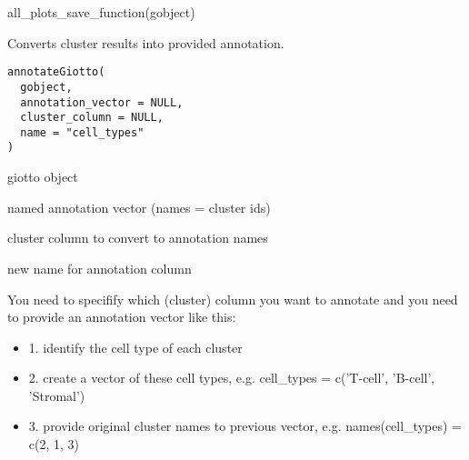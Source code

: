 \documentclass[a4paper]{book}
\begin{document}
%
\begin{SeeAlso}\relax
{}
\end{SeeAlso}
%
\begin{Examples}
\begin{ExampleCode}
    all_plots_save_function(gobject)
\end{ExampleCode}
\end{Examples}
%
\begin{Description}\relax
Converts cluster results into provided annotation.
\end{Description}
%
\begin{Usage}
\begin{verbatim}
annotateGiotto(
  gobject,
  annotation_vector = NULL,
  cluster_column = NULL,
  name = "cell_types"
)
\end{verbatim}
\end{Usage}
%
\begin{Arguments}
\begin{ldescription}
\item[\code{gobject}] giotto object

\item[\code{annotation\_vector}] named annotation vector (names = cluster ids)

\item[\code{cluster\_column}] cluster column to convert to annotation names

\item[\code{name}] new name for annotation column
\end{ldescription}
\end{Arguments}
%
\begin{Details}\relax
You need to specifify which (cluster) column you want to annotate
and you need to provide an annotation vector like this:
\begin{itemize}

\item{} 1. identify the cell type of each cluster
\item{} 2. create a vector of these cell types, e.g. cell\_types =  c('T-cell', 'B-cell', 'Stromal')
\item{} 3. provide original cluster names to previous vector, e.g. names(cell\_types) = c(2, 1, 3)

\end{itemize}

\end{Details}
\end{document}
